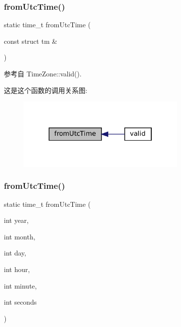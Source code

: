 \subsubsection{\texorpdfstring{from\+Utc\+Time()}{fromUtcTime()}\hspace{0.1cm}{\footnotesize\ttfamily [1/2]}}
{\footnotesize\ttfamily static time\+\_\+t from\+Utc\+Time (\begin{DoxyParamCaption}\item[{const struct tm \&}]{ }\end{DoxyParamCaption})\hspace{0.3cm}{\ttfamily [static]}}



参考自 Time\+Zone\+::valid().

这是这个函数的调用关系图\+:
\nopagebreak
\begin{figure}[H]
\begin{center}
\leavevmode
\includegraphics[width=238pt]{classmuduo_1_1TimeZone_a33248c9e6e6b89a5ae6c4186daee24b1_icgraph}
\end{center}
\end{figure}
\mbox{\label{classmuduo_1_1TimeZone_a33e04a26ea809b5500881782486f1115}} 
\subsubsection{\texorpdfstring{from\+Utc\+Time()}{fromUtcTime()}\hspace{0.1cm}{\footnotesize\ttfamily [2/2]}}
{\footnotesize\ttfamily static time\+\_\+t from\+Utc\+Time (\begin{DoxyParamCaption}\item[{int}]{year,  }\item[{int}]{month,  }\item[{int}]{day,  }\item[{int}]{hour,  }\item[{int}]{minute,  }\item[{int}]{seconds }\end{DoxyParamCaption})\hspace{0.3cm}{\ttfamily [static]}}

